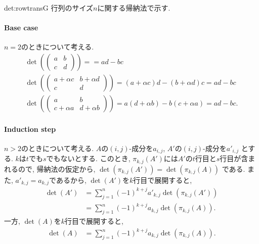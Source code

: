 \begin{proofof*}{det:rowtrans}{G}
  行列のサイズ$n$に関する帰納法で示す.
  \paragraph{Base case}
  $n=2$のときについて考える.
  \begin{align*}
    \det(
    \begin{pmatrix}
      a&b\\
      c&d
    \end{pmatrix}
    )==ad-bc\\
    \det(
    \begin{pmatrix}
      a+\alpha c& b+\alpha d\\
      c&d
    \end{pmatrix}
    )=(a+\alpha c)d-(b+\alpha d)c=ad-bc\\
    \det(
    \begin{pmatrix}
      a& b\\
      c+\alpha a&d+\alpha b
    \end{pmatrix}
    )=a(d+\alpha b)-b(c+\alpha a)=ad-bc.
  \end{align*}
  \paragraph{Induction step}
  $n>2$のときについて考える.
  $A$の$(i,j)$-成分を$a_{i,j}$,
  $A'$の$(i,j)$-成分を$a'_{i,j}$
  とする.
  $k$は$t$でも$s$でもないとする.
  このとき,
  $\pi_{k,j}(A')$には$A'$の$t$行目と$s$行目が含まれるので,
  帰納法の仮定から,
  $\det(\pi_{k,j}(A'))=\det(\pi_{k,j}(A))$
  である.
  また, $a'_{k,j}=a_{k,j}$であるから,
  $\det(A')$を$k$行目で展開すると,
  \begin{align*}
    \det(A')
    &=\sum_{j=1}^{n} (-1)^{k+j} a'_{k,j}\det(\pi_{k,j}(A'))\\
    &=\sum_{j=1}^{n} (-1)^{k+j} a_{k,j}\det(\pi_{k,j}(A)).
  \end{align*}
  一方, $\det(A)$を$k$行目で展開すると,
  \begin{align*}
    \det(A)
    &=\sum_{j=1}^{n} (-1)^{k+j} a_{k,j}\det(\pi_{k,j}(A)).
  \end{align*}  
\end{proofof*}


